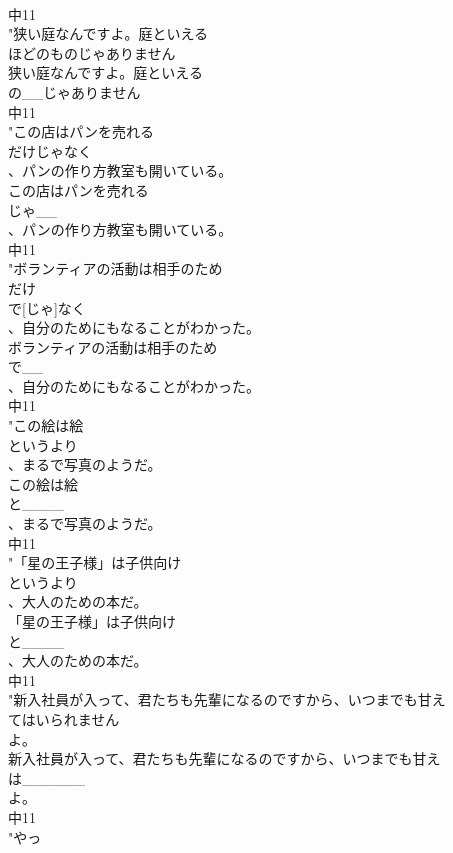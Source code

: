 \documentclass[8pt]{extreport}
\begin{document}
\begin{CJK}{UTF8}{min}
\\	中11
\\	"狭い庭なんですよ。庭といえる
\\	ほどのものじゃありません
\\	狭い庭なんですよ。庭といえる
\\	の__じゃありません
\\	中11
\\	"この店はパンを売れる
\\	だけじゃなく
\\	、パンの作り方教室も開いている。
\\	この店はパンを売れる
\\	じゃ__
\\	、パンの作り方教室も開いている。
\\	中11
\\	"ボランティアの活動は相手のため
\\	だけ
\\	で[じゃ]なく
\\	、自分のためにもなることがわかった。
\\	ボランティアの活動は相手のため
\\	で__
\\	、自分のためにもなることがわかった。
\\	中11
\\	"この絵は絵
\\	というより
\\	、まるで写真のようだ。
\\	この絵は絵
\\	と____
\\	、まるで写真のようだ。
\\	中11
\\	"「星の王子様」は子供向け
\\	というより
\\	、大人のための本だ。
\\	「星の王子様」は子供向け
\\	と____
\\	、大人のための本だ。
\\	中11
\\	"新入社員が入って、君たちも先輩になるのですから、いつまでも甘え
\\	てはいられません
\\	よ。
\\	新入社員が入って、君たちも先輩になるのですから、いつまでも甘え
\\	は______
\\	よ。
\\	中11
\\	"やっ

\end{CJK}
\end{document}
